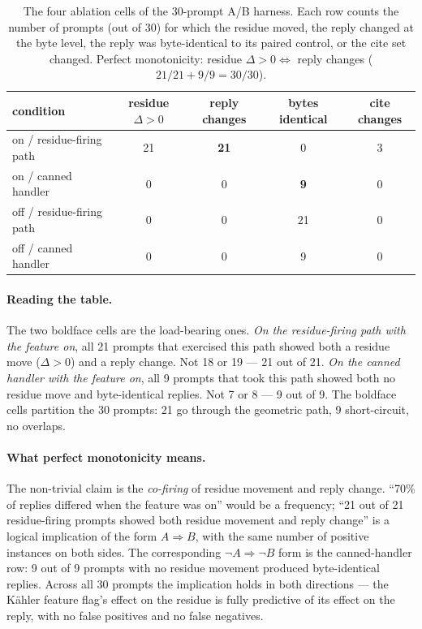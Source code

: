\documentclass[11pt,letterpaper]{article}
\begin{document}
\begin{table}[h]
\centering
\begin{tabular}{lcccc}
\toprule
condition & residue $\Delta > 0$ & reply changes & bytes identical & cite changes \\
\midrule
on / residue-firing path  & 21 & \textbf{21} & 0  & 3 \\
on / canned handler       & 0  & 0           & \textbf{9} & 0 \\
off / residue-firing path & 0  & 0           & 21 & 0 \\
off / canned handler      & 0  & 0           & 9  & 0 \\
\bottomrule
\end{tabular}
\caption{The four ablation cells of the 30-prompt A/B harness.
Each row counts the number of prompts (out of 30) for which the
residue moved, the reply changed at the byte level, the reply was
byte-identical to its paired control, or the cite set changed.
Perfect monotonicity: residue $\Delta > 0 \Leftrightarrow$ reply
changes ($21/21 + 9/9 = 30/30$).}
\label{tab:fourcells}
\end{table}

\paragraph{Reading the table.}
The two boldface cells are the load-bearing ones. \emph{On the
residue-firing path with the feature on}, all 21 prompts that
exercised this path showed both a residue move ($\Delta > 0$) and a
reply change. Not 18 or 19 --- 21 out of 21. \emph{On the canned
handler with the feature on}, all 9 prompts that took this path
showed both no residue move and byte-identical replies. Not 7 or
8 --- 9 out of 9. The boldface cells partition the 30 prompts: 21
go through the geometric path, 9 short-circuit, no overlaps.

\paragraph{What perfect monotonicity means.}
The non-trivial claim is the \emph{co-firing} of residue movement
and reply change. ``70\% of replies differed when the feature was
on'' would be a frequency; ``21 out of 21 residue-firing prompts
showed both residue movement and reply change'' is a logical
implication of the form $A \Rightarrow B$, with the same number of
positive instances on both sides. The corresponding $\neg A
\Rightarrow \neg B$ form is the canned-handler row: 9 out of 9
prompts with no residue movement produced byte-identical replies.
Across all 30 prompts the implication holds in both directions ---
the K\"ahler feature flag's effect on the residue is fully
predictive of its effect on the reply, with no false positives and
no false negatives.
\end{document}
